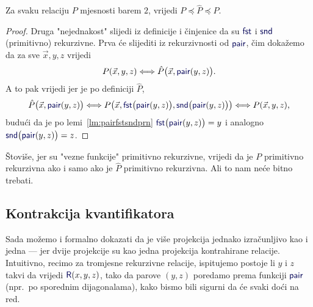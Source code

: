 \begin{lema}[{name=[međusobna svedivost relacije i njene kontrakcije]}]\label{lm:hatPeqP}
Za svaku relaciju $P$ mjesnosti barem $2$, vrijedi $P\preceq\hat P\preceq P$.
\end{lema}
\begin{proof}
Druga "nejednakost" slijedi iz definicije i činjenice da su $\f{fst}$ i $\f{snd}$ (primitivno) rekurzivne. Prva će slijediti iz rekurzivnosti od $\f{pair}$, čim dokažemo da za sve $\vec x,y,z$ vrijedi
\begin{equation}\label{eq:hatPpair}
    P(\vec x,y,z)\Longleftrightarrow\hat P\bigl(\vec x,\f{pair}(y,z)\bigr)\text.
\end{equation}
A to pak vrijedi jer je po definiciji $\hat P$,
\begin{equation}
    \hat P\bigl(\vec x,\f{pair}(y,z)\bigr)\Longleftrightarrow P\bigl(\vec x,\f{fst}\bigl(\f{pair}(y,z)\bigr),\f{snd}\bigl(\f{pair}(y,z)\bigr)\bigr)\Longleftrightarrow P(\vec x,y,z)\text,
\end{equation}
budući da je po lemi~\ref{lm:pairfstsndprn} $\f{fst}\bigl(\f{pair}(y,z)\bigr)=y$ i analogno $\f{snd}\bigl(\f{pair}(y,z)\bigr)=z$.
\end{proof}

\begin{napomena}[{name=[kontrahiranje čuva i primitivnu rekurzivnost]}]
Štoviše, jer su "vezne funkcije" primitivno rekurzivne, vrijedi da je $P$ primitivno rekurzivna ako i samo ako je $\hat P$ primitivno rekurzivna. Ali to nam neće bitno trebati.
\end{napomena}

\subsection{Kontrakcija kvantifikatora}

Sada možemo i formalno dokazati da je više projekcija jednako izračunljivo kao i jedna --- jer dvije projekcije su kao jedna projekcija kontrahirane relacije. Intuitivno, recimo za tromjesne rekurzivne relacije, ispitujemo postoje li $y$ i $z$ takvi da vrijedi $\f R(x,y,z)$, tako da parove $(y,z)$ poredamo prema funkciji $\f{pair}$ (npr.\ po sporednim dijagonalama), kako bismo bili sigurni da će svaki doći na red.

